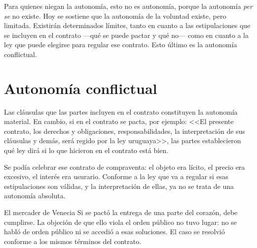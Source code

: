 \documentclass[12pt,oneside]{book}
\begin{document}
Para quienes niegan la autonom\'ia, esto no es autonom\'ia, porque la autonom\'ia \emph{per se} no existe. Hoy se sostiene que la autonom\'ia de la voluntad existe, pero limitada. Existir\'an determinados l\'imites, tanto en cuanto a las estipulaciones que se incluyen en el contrato ---qu\'e se puede pactar y qu\'e no--- como en cuanto a la ley que puede elegirse para regular ese contrato. Esto \'ultimo es la autonom\'ia conflictual.

\section{Autonom\'ia conflictual}

Las cl\'ausulas que las partes incluyen en el contrato constituyen la autonom\'ia material. En cambio, si en el contrato se pacta, por ejemplo: <<El presente contrato, los derechos y obligaciones, responsabilidades, la interpretaci\'on de sus cl\'ausulas y dem\'as, ser\'a regido por la ley uruguaya>>, las partes establecieron qu\'e ley dir\'a si lo que hicieron en el contrato est\'a bien.


Se pod\'ia celebrar ese contrato de compraventa: el objeto era l\'icito, el precio era excesivo, el inter\'es era usurario. Conforme a la ley que va a regular si esas estipulaciones son v\'alidas, y la interpretaci\'on de ellas, ya no se trata de una autonom\'ia absoluta.

\begin{example}{El mercader de Venecia}
Si se pact\'o la entrega de una parte del coraz\'on, debe cumplirse. La objeci\'on de que ello viola el orden p\'ublico no tuvo lugar: no se habl\'o de orden p\'ublico ni se accedi\'o a esas soluciones. El caso se resolvi\'o conforme a los mismos t\'erminos del contrato.
\end{example}
\end{document}
